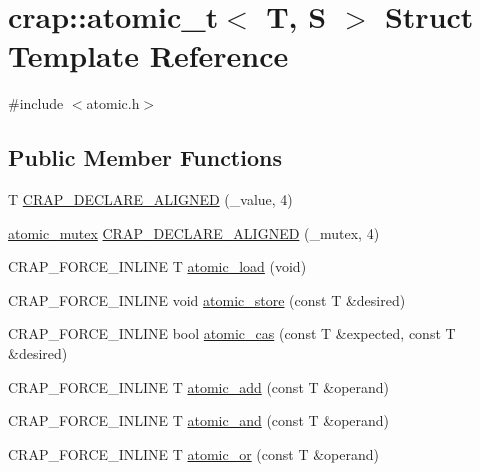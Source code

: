 \hypertarget{structcrap_1_1atomic__t}{}\section{crap\+:\+:atomic\+\_\+t$<$ T, S $>$ Struct Template Reference}
\label{structcrap_1_1atomic__t}


{\ttfamily \#include $<$atomic.\+h$>$}

\subsection*{Public Member Functions}
\begin{DoxyCompactItemize}
\item 
T \hyperlink{structcrap_1_1atomic__t_acf41b173b37babd0638827d7bae9a37c}{C\+R\+A\+P\+\_\+\+D\+E\+C\+L\+A\+R\+E\+\_\+\+A\+L\+I\+G\+N\+E\+D} (\+\_\+value, 4)
\item 
\hyperlink{structcrap_1_1atomic__mutex}{atomic\+\_\+mutex} \hyperlink{structcrap_1_1atomic__t_a654b638e82309744b711741110a09a52}{C\+R\+A\+P\+\_\+\+D\+E\+C\+L\+A\+R\+E\+\_\+\+A\+L\+I\+G\+N\+E\+D} (\+\_\+mutex, 4)
\item 
C\+R\+A\+P\+\_\+\+F\+O\+R\+C\+E\+\_\+\+I\+N\+L\+I\+N\+E T \hyperlink{structcrap_1_1atomic__t_a34d508d934dd5d71e35ce1d57fc4d26e}{atomic\+\_\+load} (void)
\item 
C\+R\+A\+P\+\_\+\+F\+O\+R\+C\+E\+\_\+\+I\+N\+L\+I\+N\+E void \hyperlink{structcrap_1_1atomic__t_af5501086f0a564b67fa7a4187b1628ad}{atomic\+\_\+store} (const T \&desired)
\item 
C\+R\+A\+P\+\_\+\+F\+O\+R\+C\+E\+\_\+\+I\+N\+L\+I\+N\+E bool \hyperlink{structcrap_1_1atomic__t_aeef056d07aec9f4b447d27310fdb33e2}{atomic\+\_\+cas} (const T \&expected, const T \&desired)
\item 
C\+R\+A\+P\+\_\+\+F\+O\+R\+C\+E\+\_\+\+I\+N\+L\+I\+N\+E T \hyperlink{structcrap_1_1atomic__t_a085f2360bcc3f32e591c05b4946821c2}{atomic\+\_\+add} (const T \&operand)
\item 
C\+R\+A\+P\+\_\+\+F\+O\+R\+C\+E\+\_\+\+I\+N\+L\+I\+N\+E T \hyperlink{structcrap_1_1atomic__t_a1dc7264b4de620c3717d5d8f412b50d4}{atomic\+\_\+and} (const T \&operand)
\item 
C\+R\+A\+P\+\_\+\+F\+O\+R\+C\+E\+\_\+\+I\+N\+L\+I\+N\+E T \hyperlink{structcrap_1_1atomic__t_a1d1d71c3a2798875944291f837214922}{atomic\+\_\+or} (const T \&operand)
\end{DoxyCompactItemize}


